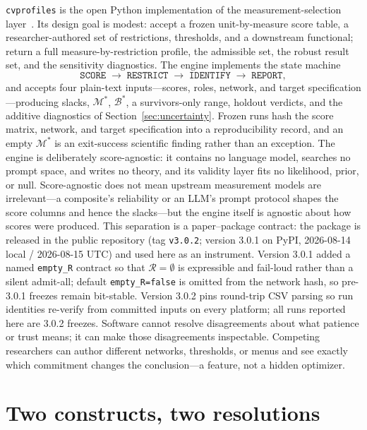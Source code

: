 \documentclass[10pt,letterpaper]{article}
\newcommand{\cvp}{\texttt{cvprofiles}}
\newcommand{\M}{\ensuremath{\mathcal{M}}}
\newcommand{\Rset}{\mathcal{R}}
\newcommand{\Bset}{\mathcal{B}}
\begin{document}
\cvp{} is the open Python implementation of the measurement-selection layer~\cite{cvprofiles}.
Its design goal is modest: accept a frozen unit-by-measure score table, a researcher-authored set of restrictions, thresholds, and a downstream functional; return a full measure-by-restriction profile, the admissible set, the robust result set, and the sensitivity diagnostics.
The engine implements the state machine
\begin{equation}
\texttt{SCORE} \;\longrightarrow\; \texttt{RESTRICT} \;\longrightarrow\; \texttt{IDENTIFY} \;\longrightarrow\; \texttt{REPORT},
\label{eq:statemachine}
\end{equation}
and accepts four plain-text inputs---scores, roles, network, and target specification---producing slacks, $\M^*$, $\Bset^*$, a survivors-only range, holdout verdicts, and the additive diagnostics of Section~\ref{sec:uncertainty}.
Frozen runs hash the score matrix, network, and target specification into a reproducibility record, and an empty $\M^*$ is an exit-success scientific finding rather than an exception.
The engine is deliberately score-agnostic: it contains no language model, searches no prompt space, and writes no theory, and its validity layer fits no likelihood, prior, or null.
Score-agnostic does not mean upstream measurement models are irrelevant---a composite's reliability or an LLM's prompt protocol shapes the score columns and hence the slacks---but the engine itself is agnostic about how scores were produced.
This separation is a paper--package contract: the package is released in the public repository (tag \texttt{v3.0.2}; version 3.0.1 on PyPI, 2026-08-14 local / 2026-08-15 UTC) and used here as an instrument.
Version 3.0.1 added a named \texttt{empty\_R} contract so that $\Rset=\emptyset$ is expressible and fail-loud rather than a silent admit-all; default \texttt{empty\_R=false} is omitted from the network hash, so pre-3.0.1 freezes remain bit-stable.
Version 3.0.2 pins round-trip CSV parsing so run identities re-verify from committed inputs on every platform; all runs reported here are 3.0.2 freezes.
Software cannot resolve disagreements about what patience or trust means; it can make those disagreements inspectable.
Competing researchers can author different networks, thresholds, or menus and see exactly which commitment changes the conclusion---a feature, not a hidden optimizer.

\section{Two constructs, two resolutions}
\label{sec:app}
\end{document}
